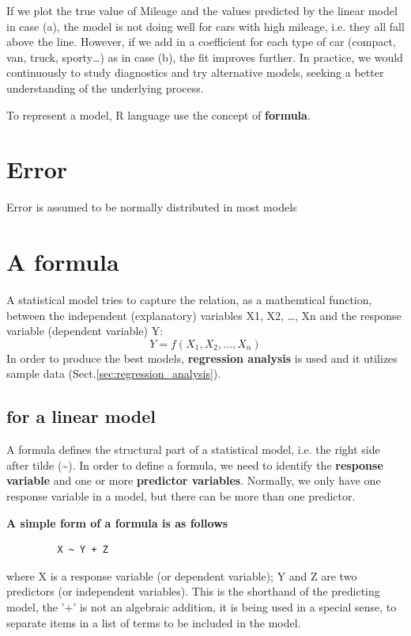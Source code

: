 If we plot the true value of Mileage and the values predicted by the
linear model in case (a), the model is not doing well for cars with
high mileage, i.e. they all fall above the line. However, if we add in
a coefficient for each type of car (compact, van, truck, sporty…) as
in case (b), the fit improves further. In practice, we would
continuously to study diagnostics and try alternative models, seeking
a better understanding of the underlying process.


To represent a model, R language use the concept of {\bf formula}.

\section{Error}
\label{sec:error}

Error is assumed to be normally distributed in most models

\section{A formula}
\label{sec:formula}

A statistical model tries to capture the relation, as a mathemtical function,
between the independent (explanatory) variables X1, X2, \ldots, Xn and the
response variable (dependent variable) Y: 
\begin{equation}
Y = f(X_1, X_2, \ldots, X_n)
\end{equation}
In order to produce the best models, {\bf regression analysis} is used and it
utilizes sample data (Sect.\ref{sec:regression_analysis}). 

\subsection{for a linear model}
\label{sec:linear-model}


A formula defines the structural part of a statistical model, i.e. the right
side after tilde (\textasciitilde). In order to define a formula, we need to
identify the {\bf response variable} and one or more {\bf predictor variables}.
Normally, we only have one response variable in a model, but there can be more
than one predictor.

{\bf A simple form of a formula is as follows}
\begin{verbatim}
         X ~ Y + Z
\end{verbatim}
where X is a response variable (or dependent variable); Y and Z are
two predictors (or independent variables).  This is the shorthand of
the predicting model, the '+' is not an algebraic addition, it is
being used in a special sense, to separate items in a list of terms to
be included in the model.


